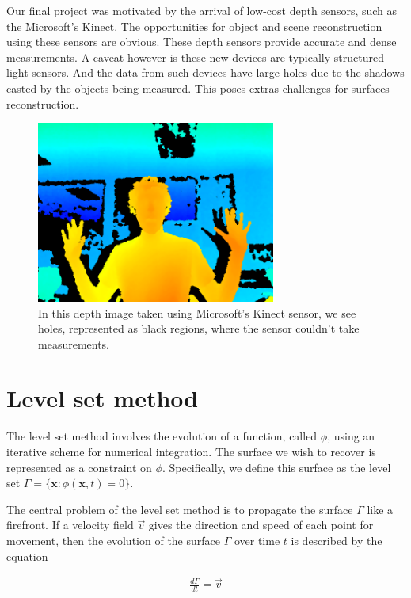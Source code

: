 \documentclass{article}
\begin{document}
Our final project was motivated by the arrival of low-cost depth sensors, such
as the Microsoft's Kinect. The opportunities for object and scene
reconstruction using these sensors are obvious. These depth sensors provide
accurate and dense measurements. A caveat however is these new devices are
typically structured light sensors. And the data from such devices have large
holes due to the shadows casted by the objects being measured. This poses
extras challenges for surfaces reconstruction.

\begin{figure}
  \centering
  \includegraphics[width=0.7\textwidth]{img/depthmap.png}
  \caption{In this depth image taken using Microsoft's Kinect sensor, we see
holes, represented as black regions, where the sensor couldn't take
measurements.}

\end{figure}

\section{Level set method}
The level set method involves the evolution of a function, called $\phi$,
using an iterative scheme for numerical integration. The surface we wish to
recover is represented as a constraint on $\phi$. Specifically, we define this
surface as the level set $\Gamma=\{\mathbf{x}:\phi(\mathbf{x}, t)=0\}$.

The central problem of the level set method is to propagate the surface
$\Gamma$ like a firefront. If a velocity field $\vec{v}$ gives the direction
and speed of each point for movement, then the evolution of the surface
$\Gamma$ over time $t$ is described by the equation

\begin{align}
  \frac{d \Gamma}{dt} = \vec{v}
\end{align}
\end{document}
